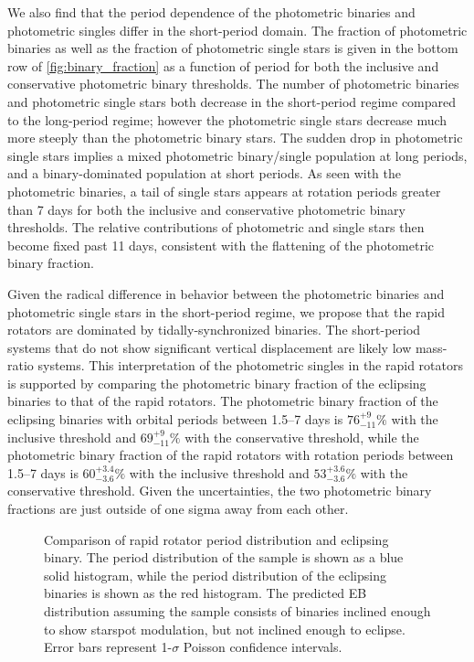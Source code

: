 \documentclass[manuscript]{aastex6}
\begin{document}
We also find that the period dependence of the photometric binaries and
photometric singles differ in the short-period domain. The fraction of
photometric binaries as well as the fraction of
photometric single stars is given in the bottom row of
\cref{fig:binary_fraction} as a function of period for both the inclusive and 
conservative photometric binary thresholds. The number of photometric binaries 
and photometric single stars both decrease in the short-period regime compared to the 
long-period regime; however the photometric single stars decrease much more 
steeply than the photometric binary stars. The sudden drop in photometric 
single stars implies a mixed photometric binary/single population at long 
periods, and a binary-dominated population at short periods. As seen with the
photometric binaries, a tail of single stars appears at rotation periods 
greater than 7 days for both the inclusive and conservative photometric binary 
thresholds. The relative contributions of photometric and single stars then 
become fixed past 11 days, consistent with the flattening of the photometric 
binary fraction. 

Given the radical difference in behavior between the photometric binaries and
photometric single stars in the short-period regime, we propose that the 
rapid rotators are dominated by tidally-synchronized binaries. The 
short-period systems that do not show significant vertical displacement are 
likely low mass-ratio systems. This interpretation of the photometric singles 
in the rapid rotators is supported by comparing the photometric binary 
fraction of the eclipsing binaries to that of the rapid rotators. The 
photometric binary fraction of the eclipsing binaries with orbital periods 
between 1.5--7 days is \(76^{+9}_{-11}\%\) with the inclusive threshold and 
\(69^{+9}_{-11}\%\) with the conservative threshold, while the photometric 
binary fraction of the rapid rotators with rotation periods between 1.5--7
days is \(60^{+3.4}_{-3.6}\%\) with the inclusive threshold and
\(53^{+3.6}_{-3.6}\%\) with the conservative threshold.  Given the
uncertainties, the two photometric binary fractions are just outside of one 
sigma away from each other.

\begin{figure}[htb]
    \centering
    \caption{Comparison of rapid rotator period distribution and eclipsing
    binary. The period distribution of the \citet{McQuillan14} sample is shown
as a blue solid histogram, while the period distribution of the eclipsing binaries
is shown as the red histogram. The predicted EB distribution assuming the
\citet{McQuillan14} sample consists of binaries inclined enough to show
starspot modulation, but not inclined enough to eclipse. Error bars represent
1-\(\sigma\) Poisson confidence intervals.}\label{fig:eclipseprob}
\end{figure}
\end{document}
